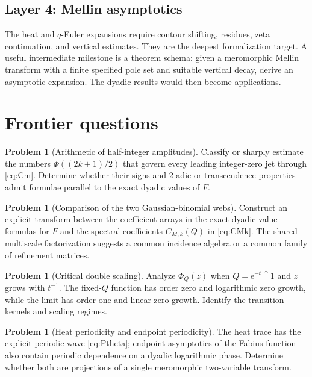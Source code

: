 \documentclass[11pt,oneside]{article}
\numberwithin{equation}{section}
\theoremstyle{plain}
\theoremstyle{definition}
\newtheorem{problem}[theorem]{Problem}
\theoremstyle{remark}
\newcommand{\e}{\mathrm e}
\begin{document}
\subsection{Layer 4: Mellin asymptotics}

The heat and $q$-Euler expansions require contour shifting, residues, zeta continuation, and vertical estimates.  They are the deepest formalization target.  A useful intermediate milestone is a theorem schema: given a meromorphic Mellin transform with a finite specified pole set and suitable vertical decay, derive an asymptotic expansion.  The dyadic results would then become applications.

\section{Frontier questions}

\begin{problem}[Arithmetic of half-integer amplitudes]
Classify or sharply estimate the numbers $\Phi((2k+1)/2)$ that govern every leading integer-zero jet through \cref{eq:Cm}.  Determine whether their signs and $2$-adic or transcendence properties admit formulae parallel to the exact dyadic values of $F$.
\end{problem}

\begin{problem}[Comparison of the two Gaussian-binomial webs]
Construct an explicit transform between the coefficient arrays in the exact dyadic-value formulas for $F$ and the spectral coefficients $C_{M,k}(Q)$ in \cref{eq:CMk}.  The shared multiscale factorization suggests a common incidence algebra or a common family of refinement matrices.
\end{problem}

\begin{problem}[Critical double scaling]
Analyze $\Phi_Q(z)$ when $Q=\e^{-t}\uparrow1$ and $z$ grows with $t^{-1}$.  The fixed-$Q$ function has order zero and logarithmic zero growth, while the limit has order one and linear zero growth.  Identify the transition kernels and scaling regimes.
\end{problem}

\begin{problem}[Heat periodicity and endpoint periodicity]
The heat trace has the explicit periodic wave \cref{eq:Ptheta}; endpoint asymptotics of the Fabius function also contain periodic dependence on a dyadic logarithmic phase.  Determine whether both are projections of a single meromorphic two-variable transform.
\end{problem}
\end{document}
